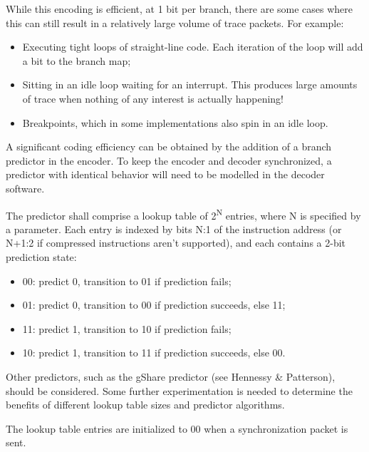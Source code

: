 While this encoding is efficient, at 1 bit per branch, there are some cases where this
can still result in a relatively large volume of trace packets.  For example:

\begin{itemize}
  \item Executing tight loops of straight-line code.  Each iteration of the loop will add a bit to the branch map;
  \item Sitting in an idle loop waiting for an interrupt.  This produces large amounts of trace when nothing of 
  any interest is actually happening!  
  \item Breakpoints, which in some implementations also spin in an idle loop.
\end{itemize}

A significant coding efficiency can be obtained by the addition of a branch predictor in the encoder. To keep
the encoder and decoder synchronized, a predictor with identical behavior will need to be modelled in the decoder
software.

The predictor shall comprise a lookup table of 2\textsuperscript{N} entries, where N is specified by a parameter.  
Each entry is indexed by bits N:1 of the instruction address (or N+1:2 if compressed instructions aren't supported), 
and each contains a 2-bit prediction state:
\begin{itemize}
  \item 00: predict 0, transition to 01 if prediction fails;
  \item 01: predict 0, transition to 00 if prediction succeeds, else 11;
  \item 11: predict 1, transition to 10 if prediction fails;
  \item 10: predict 1, transition to 11 if prediction succeeds, else 00.
\end{itemize}

Other predictors, such as the gShare predictor (see Hennessy \& Patterson), should be considered.  Some further
experimentation is needed to determine the benefits of different lookup table sizes and predictor algorithms.

The lookup table entries are initialized to 00 when a synchronization packet is sent.

